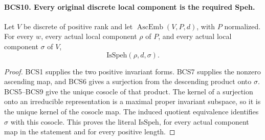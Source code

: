 \documentclass[11pt,a4paper]{article}
\numberwithin{equation}{section}
\theoremstyle{remark}\newtheorem{remark}[theorem]{Remark}
\begin{document}
\paragraph{BCS10. Every original discrete local component is the required Speh.}
\label{claim:BCS10}
Let \(V\) be discrete of positive rank and let
\(\operatorname{AscEmb}(V,P,d)\), with \(P\) normalized.
For every \(w\), every actual local component \(\rho\) of
\(P\), and every actual local component \(\sigma\) of \(V\),
\[
                         \mathrm{IsSpeh}(\rho,d,\sigma).
 \tag{BCS.19}
\]
\begin{proof}
BCS1 supplies the two positive invariant forms.  BCS7 supplies the
nonzero ascending map, and BCS6 gives a surjection from the
descending product onto \(\sigma\).  BCS5--BCS9 give the unique
cosocle of that product.  The kernel of a surjection onto an
irreducible representation is a maximal proper invariant subspace,
so it is the unique kernel of the cosocle map.  The induced quotient
equivalence identifies \(\sigma\) with this cosocle.  This proves
the literal \(\mathrm{IsSpeh}\), for every actual component map
in the statement and for every positive length.
\end{proof}

\end{document}

